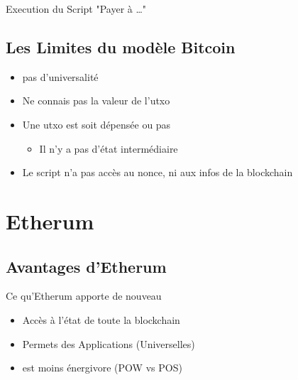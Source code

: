 \documentclass[presentation]{beamer}
\begin{document}
\begin{frame}[label={sec:orgbcfe472}]{Execution du Script "Payer à \ldots{}"}
\end{frame}

\subsection{Les Limites du modèle Bitcoin}
\label{sec:org6357b14}
\begin{frame}[label={sec:org14f4857}]{}
\begin{itemize}
\item pas d'universalité
\item Ne connais pas la valeur de l'utxo
\item Une utxo est soit dépensée ou pas
\begin{itemize}
\item Il n'y a pas d'état intermédiaire
\end{itemize}
\item Le script n'a pas accès au nonce,  ni aux infos de la blockchain
\end{itemize}
\end{frame}
\section{Etherum}
\label{sec:orgac6a302}
\subsection{Avantages d'Etherum}
\label{sec:orgee46ec1}
\begin{frame}[label={sec:org1d82f65}]{Ce qu'Etherum apporte de nouveau}
\begin{itemize}
\item Accès à l'état de toute la blockchain
\item Permets des Applications (Universelles)
\item est moins énergivore (POW vs POS)
\end{itemize}
\end{frame}
\end{document}
